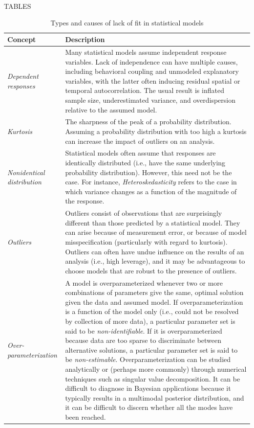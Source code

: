 \documentclass[12pt,english]{article}
\begin{document}
\begin{spacing}{1.9}
\renewcommand{\refname}{Literature Cited} 






TABLES

\begin{table}[htp]
  \caption{Types and causes of lack of fit in statistical models}
  \label{tab:lof}
  \centering
  \begin{tabular}{p{3cm}p{13cm}}
    \hline
    Concept & Description \\
    \hline
    \textit{Dependent responses} & Many statistical models assume independent response variables.  Lack of independence can have multiple causes, including behavioral coupling and unmodeled explanatory variables, with the latter often inducing residual spatial or temporal autocorrelation.  The usual result is inflated sample size, underestimated variance, and overdispersion relative to the assumed model. \\
    \textit{Kurtosis} & The sharpness of the peak of a probability distribution. Assuming a probability distribution with too high a kurtosis can increase the impact of outliers on an analysis.\\
    \textit{Nonidentical distribution} & Statistical models often assume that responses are identically distributed (i.e., have the same underlying probability distribution). However, this need not be the case.  For instance,         \textit{Heteroskedasticity} refers to the case in which variance changes as a function of the magnitude of the response.\\
    \textit{Outliers} & Outliers consist of observations that are surprisingly different than those predicted by a statistical model.  They can arise because of measurement error, or because of model misspecification (particularly with regard to kurtosis).  Outliers can often have undue influence on the results of an analysis (i.e., high leverage), and it may be advantageous to choose models that are robust to the presence of outliers. \\
    \textit{Over-parameterization} & A model is overparameterized whenever two or more combinations of parameters give the same, optimal solution given the data and assumed model.  If overparameterization is a function of the model only (i.e., could not be resolved by collection of more data), a particular parameter set is said to be \textit{non-identifiable}.  If it is overparameterized because data are too sparse to discriminate between alternative solutions, a particular parameter set is said to be \textit{non-estimable}.  Overparameterization can be studied analytically or (perhaps more commonly) through numerical techniques such as singular value decomposition.  It can be difficult to diagnose in Bayesian applications because it typically results in a multimodal posterior distribution, and it can be difficult to discern whether all the modes have been reached. \\

\end{tabular}
\end{table}
\end{spacing}
\end{document}
